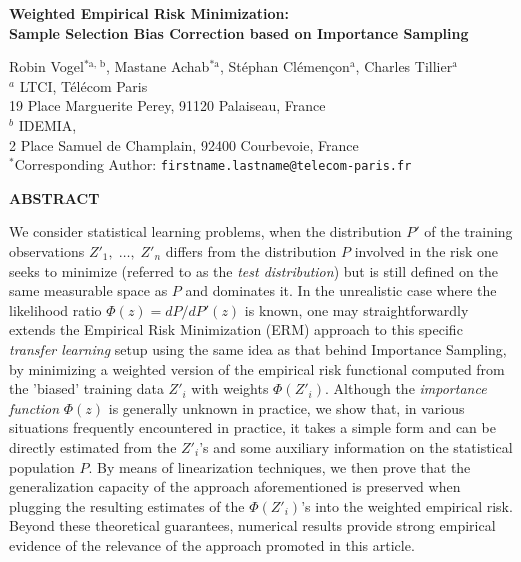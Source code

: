 \documentclass[12pt]{article}
\begin{document}
\begin{center}
{\fontsize{14}{0} \bf \selectfont
Weighted Empirical Risk Minimization:\\ Sample Selection Bias Correction based on Importance Sampling}

\bigskip
\medskip

{\fontsize{10}{0} \selectfont
    Robin Vogel$^{\text{*a, b}}$, Mastane Achab$^{\text{*a}}$, Stéphan Clémençon$^{\text{a}}$,
    Charles Tillier$^{\text{a}}$\\
    $^a$ LTCI, Télécom Paris\\
    19 Place Marguerite Perey, 91120 Palaiseau, France\\
    $^b$ IDEMIA,\\
    2 Place Samuel de Champlain, 92400 Courbevoie, France\\
    $^{*}$Corresponding Author: \texttt{firstname.lastname@telecom-paris.fr} \\
}
\end{center}
 
{ \par \centering \textbf{ABSTRACT} \par}


\noindent
We consider statistical learning problems, when the distribution $P'$ of the training observations $Z'_1,\; \ldots,\; Z'_n$ differs from the distribution $P$ involved in the risk one seeks to minimize (referred to as the \textit{test distribution}) but is still defined on the same measurable space as $P$ and dominates it. In the unrealistic case where the likelihood ratio $\Phi(z)=dP/dP'(z)$ is known, one may straightforwardly extends the Empirical Risk Minimization (ERM) approach to this specific \textit{transfer learning} setup using the same idea as that behind Importance Sampling, by minimizing a weighted version of the empirical risk functional computed from the 'biased' training data $Z'_i$ with weights $\Phi(Z'_i)$. Although the \textit{importance function} $\Phi(z)$ is generally unknown in practice, we show that, in various situations frequently encountered in practice, it takes a simple form and can be directly estimated from the $Z'_i$'s and some auxiliary information on the statistical population $P$. By means of linearization techniques, we then prove that the generalization capacity of the approach aforementioned is preserved when plugging the resulting estimates of the $\Phi(Z'_i)$'s into the  weighted empirical risk. Beyond these theoretical guarantees, numerical results provide strong empirical evidence of the relevance of the approach promoted in this article.
\end{document}
